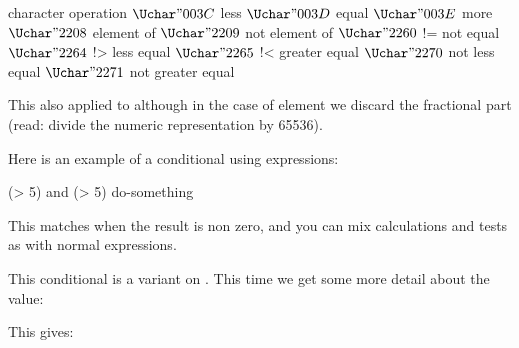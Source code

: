 \starttabulate[|l|cT|cT|l|]
\FL
\BC character      \BC               \BC    \BC operation         \NC \NR
\ML
\NC {} \NC $\Uchar"003C$ \NC    \NC less              \NC \NR
\NC {} \NC $\Uchar"003D$ \NC    \NC equal             \NC \NR
\NC {} \NC $\Uchar"003E$ \NC    \NC more              \NC \NR
\NC {} \NC $\Uchar"2208$ \NC    \NC element of        \NC \NR
\NC {} \NC $\Uchar"2209$ \NC    \NC not element of    \NC \NR
\NC {} \NC $\Uchar"2260$ \NC != \NC not equal         \NC \NR
\NC {} \NC $\Uchar"2264$ \NC !> \NC less equal        \NC \NR
\NC {} \NC $\Uchar"2265$ \NC !< \NC greater equal     \NC \NR
\NC {} \NC $\Uchar"2270$ \NC    \NC not less equal    \NC \NR
\NC {} \NC $\Uchar"2271$ \NC    \NC not greater equal \NC \NR
\LL
\stoptabulate

This also applied to  although in the case of element we discard the
fractional part (read: divide the numeric representation by 65536).

\stopoldprimitive

\startnewprimitive[title={\prm {ifnumexpression}}]

Here is an example of a conditional using expressions:

\startbuffer
\ifnumexpression (\scratchcounterone > 5) and (\scratchcountertwo > 5) \relax
    do-something
\fi
\stopbuffer

This matches when the result is non zero, and you can mix calculations and tests
as with normal expressions.

\stopnewprimitive

\startnewprimitive[title={\prm {ifnumval}}]

This conditional is a variant on . This time we get
some more detail about the value:

\stopbuffer

\typebuffer

This gives:

{\getbuffer}

\stopnewprimitive

\startoldprimitive[title={\prm {ifodd}}]

